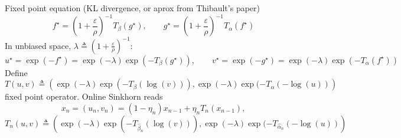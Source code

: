 \documentclass[a4paper, 10pt]{article}
\begin{document}
Fixed point equation (KL divergence, or aprox from Thibault's paper)
\begin{equation}
    f^\star = \left( 1 + \frac{\varepsilon}{\rho} \right)^{-1} T_\beta ( g^\star), \qquad
    g^\star = \left( 1 + \frac{\varepsilon}{\rho} \right)^{-1} T_\alpha ( f^\star)
\end{equation}
In unbiased space, $\lambda \triangleq \left( 1 + \frac{\varepsilon}{\rho} \right)^{-1}$:
\begin{equation}
    u^\star = \exp(-f^\star) = \exp(-\lambda) \exp(-T_\beta ( g^\star)), \qquad
    v^\star = \exp(-g^\star) = \exp(-\lambda) \exp(-T_\alpha ( f^\star))
\end{equation}
Define
\begin{equation}
    T(u, v) \triangleq \left(\exp(-\lambda) \exp(-T_\beta (\log(v))),
                    \exp(-\lambda) \exp(-T_\alpha (-\log(u)) \right)
\end{equation}
fixed point operator. Online Sinkhorn reads
\begin{equation}
    x_n = (u_n, v_n) = (1 - \eta_n) x_{n-1} + \eta_n T_n(x_{n-1}),
\end{equation}
\begin{equation}
    T_n(u, v) \triangleq \left(\exp(-\lambda) \exp(-T_{\hat \beta_n} (\log(v))),
                    \exp(-\lambda) \exp(-T_{\hat \alpha_n} (-\log(u)) \right)
\end{equation}

\printbibliography
\end{document}
